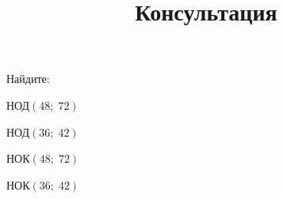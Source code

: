 \begin{listofex}
	\item Найдите:
	\begin{enumcols}[itemcolumns=4]
		\item НОД\( (48;\;72) \)
		\item НОД\( (36;\;42) \)
		\item НОК\( (48;\;72) \)
		\item НОК\( (36;\;42) \)
	\end{enumcols}
\end{listofex}
%
%
%
%
%
%
%
\newpage
\title{Консультация}
